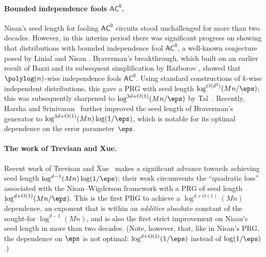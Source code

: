 \documentclass[11pt]{article}
\numberwithin{equation}{section}
\theoremstyle{definition}
\theoremstyle{plain}
\theoremstyle{plain}
\newcommand{\acz}{\mathsf{AC^0}}
\begin{document}
\vspace{-5pt}
\paragraph{Bounded independence fools $\acz$.} 
Nisan's seed length for fooling $\acz$ circuits stood
%
unchallenged  %
for more than two decades.  However, in this interim period there was significant progress on showing that distributions with bounded independence fool $\acz$, a well-known conjecture posed by Linial and Nisan \cite{LinialNisan:90}.  Braverman's breakthrough, %
%
which built on an earlier result of Bazzi \cite{Baz09} and its subsequent simplification by Razborov \cite{Raz09}, showed that $\polylog(n)$-wise independence fools $\acz$.  Using standard constructions of $k$-wise independent distributions, this gave a PRG with seed length $\log^{O(d^2)}(Mn/\eps)$; this was subsequently sharpened to $\log^{3d+O(1)}(Mn/\eps)$ by Tal~\cite{Tal:15tightbounds}.  Recently, Harsha and Srinivasan~\cite{HS16journal} further improved the seed length of Braverman's generator to $\log^{3d+O(1)}(Mn) \log(1/\eps)$, which is notable for its optimal dependence on the error parameter~$\eps$.



\vspace{-5pt} 
\paragraph{The work of Trevisan and Xue.} Recent work of Trevisan and Xue~\cite{TX13} makes a significant advance towards achieving seed length $\log^{d-1}(Mn)\log(1/\eps)$: their work circumvents the ``quadratic loss'' associated with the Nisan--Wigderson framework with a PRG of seed length $\log^{d+O(1)}(Mn/\eps)$.  This is the first PRG to achieve a $\log^{d+O(1)}(Mn)$ dependence, an exponent that is within an \emph{additive} absolute constant of the sought-for $\log^{d-1}(Mn)$, and is also the first strict improvement on Nisan's seed length in more than two decades. 
(Note, however, that, %
%
like in Nisan's PRG,  %
the dependence on $\eps$ is %
%
%
%
not optimal:  
$\log^{d+O(1)}(1/\eps)$ instead of $\log(1/\eps)$.)
\end{document}
